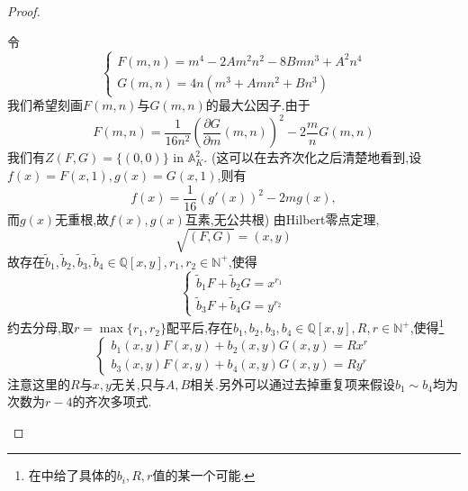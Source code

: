 \documentclass[12pt,A4paper,oneside,reqno]{amsart}
\numberwithin{equation}{section}
\theoremstyle{definition}
\theoremstyle{plain}
\theoremstyle{plain}
\numberwithin{equation}{section}
\theoremstyle{remark}
\begin{document}
\begin{proof}
\begin{enumerate}[1.]
\begin{equation*}
		\end{equation*}	
		令
		$$\begin{cases}
			F(m,n)=m^4-2Am^2n^2-8Bmn^3+A^2n^4\\
			G(m,n)=4n(m^3+Amn^2+Bn^3)
		\end{cases}$$	
		我们希望刻画$F(m,n)$与$G(m,n)$的最大公因子.由于$$F(m,n)=\frac{1}{16n^2}\left(\frac{\partial G}{\partial m}(m,n)\right)^2-2\frac{m}{n}G(m,n)$$
		我们有$Z(F,G)=\{(0,0)\}$ in $\mathbb{A}_K^2$. (这可以在去齐次化之后清楚地看到,设$f(x)=F(x,1),g(x)=G(x,1)$,则有
		$$f(x)=\frac{1}{16}(g'(x))^2-2mg(x), $$
		而$g(x)$无重根,故$f(x),g(x)$互素,无公共根) 由Hilbert零点定理,
		$$\sqrt{(F,G)}=(x,y)$$
		故存在$\tilde{b}_1,\tilde{b}_2,\tilde{b}_3,\tilde{b}_4 \in \mathbb{Q}[x,y], r_1,r_2 \in \mathbb{N}^+$,使得
		$$\begin{cases}
		\tilde{b}_1F+\tilde{b}_2G=x^{r_1}\\
		\tilde{b}_3F+\tilde{b}_4G=y^{r_2}
		\end{cases}$$
		约去分母,取$r=\max \{r_1,r_2\}$配平后,存在$b_1,b_2,b_3,b_4 \in \mathbb{Q}[x,y], R,r \in \mathbb{N}^+$,使得\footnote{在\cite[p222, Sublemma 4.3]{tate1974the}中给了具体的$b_i,R,r$值的某一个可能.}
		\begin{equation}\label{eq:UFD}
			\begin{cases}
			b_1(x,y)F(x,y)+b_2(x,y)G(x,y)=Rx^r\\
			b_3(x,y)F(x,y)+b_4(x,y)G(x,y)=Ry^r
			\end{cases}
		\end{equation}		
		注意这里的$R$与$x,y$无关,只与$A,B$相关.另外可以通过去掉重复项来假设$b_1 \sim b_4$均为次数为$r-4$的齐次多项式.
		

\end{enumerate}
\end{proof}
\end{document}
